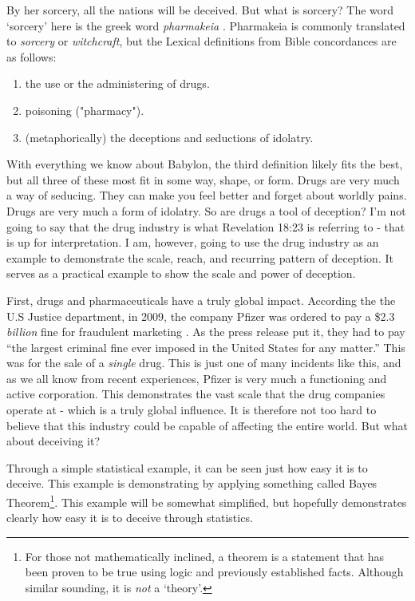 \documentclass[10pt]{article}
\begin{document}
\begin{multicols}{2}
By her sorcery, all the nations will be deceived. But what is sorcery? The word `sorcery' here is the greek word \textit{pharmakeia} \cite{pharmakeia}. Pharmakeia is commonly translated to \textit{sorcery} or \textit{witchcraft}, but the Lexical definitions from Bible concordances are as follows:
\begin{enumerate}\itemsep0em 
\item the use or the administering of drugs.
\item poisoning ("pharmacy").
\item (metaphorically) the deceptions and seductions of idolatry.
\end{enumerate}
With everything we know about Babylon, the third definition likely fits the best, but all three of these most fit in some way, shape, or form. Drugs are very much a way of seducing. They can make you feel better and forget about worldly pains. Drugs are very much a form of idolatry. So are drugs a tool of deception? I'm not going to say that the drug industry is what  Revelation 18:23 is referring to - that is up for interpretation. I am, however, going to use the drug industry as an example to demonstrate the scale, reach, and recurring pattern of deception. It serves as a practical example to show the scale and power of deception.

First, drugs and pharmaceuticals have a truly global impact. According the the U.S Justice department, in 2009, the company Pfizer was ordered to pay a \$2.3 \textit{billion} fine for fraudulent marketing \cite{pfizer_fine}. As the press release put it, they had to pay ``the largest criminal fine ever imposed in the United States for any matter.'' This was for the sale of a \textit{single} drug. This is just one of many incidents like this, and as we all know from recent experiences, Pfizer is very much a functioning and active corporation. This demonstrates the vast scale that the drug companies operate at - which is a truly global influence. It is therefore not too hard to believe that this industry could be capable of affecting the entire world. But what about deceiving it?

Through a simple statistical example, it can be seen just how easy it is to deceive. This example is demonstrating by applying something called Bayes Theorem\footnote{For those not mathematically inclined, a theorem is a statement that has been proven to be true using logic and previously established facts. Although similar sounding, it is \textit{not} a `theory'.}. This example will be somewhat simplified, but hopefully demonstrates clearly how easy it is to deceive through statistics. 


\end{multicols}
\end{document}
